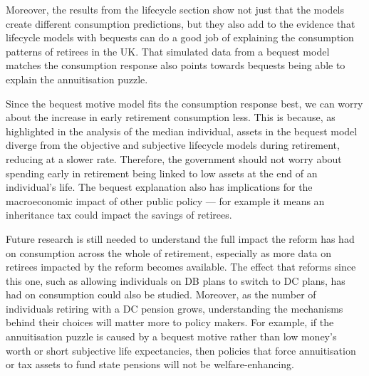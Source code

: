 \documentclass[12pt]{article}
\begin{document}
Moreover, the results from the lifecycle section show not just that the models
create different consumption predictions, but they also add to the evidence that
lifecycle models with bequests can do a good job of explaining the consumption
patterns of retirees in the UK. That simulated data from a bequest model matches
the consumption response also points towards bequests being able to explain the
annuitisation puzzle.

Since the bequest motive model fits the consumption response best, we can worry
about the increase in early retirement consumption less. This is because, as
highlighted in the analysis of the median individual, assets in the bequest model
diverge from the objective and subjective lifecycle models during retirement,
reducing at a slower rate. Therefore, the government should not worry about
spending early in retirement being linked to low assets at the end of an
individual's life. The bequest explanation also has implications for the
macroeconomic impact of other public policy --- for example it means an
inheritance tax could impact the savings of retirees.

Future research is still needed to understand the full impact the reform has had
on consumption across the whole of retirement, especially as more data on
retirees impacted by the reform becomes available. The effect that reforms since
this one, such as allowing individuals on DB plans to switch to DC plans, has
had on consumption could also be studied. Moreover, as the number of individuals
retiring with a DC pension grows, understanding the mechanisms
behind their choices will matter more to policy makers. For example, if the
annuitisation puzzle is caused by a bequest motive rather than low money's worth
or short subjective life expectancies, then policies that force annuitisation or
tax assets to fund state pensions will not be welfare-enhancing.






\end{document}
